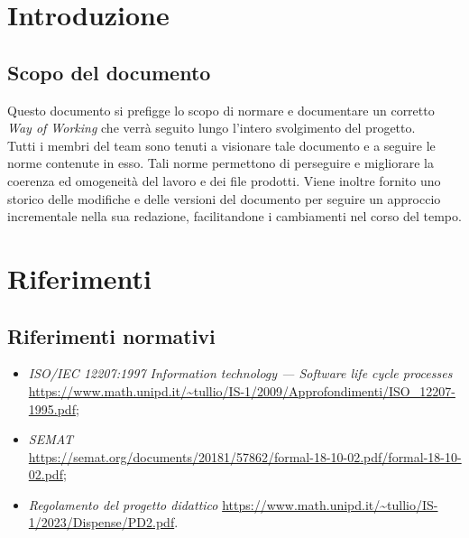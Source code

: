 \documentclass[10pt, a4paper]{article}
\title{\titolo}
\author{SWEetCode}
\begin{document}



\newpage

\tableofcontents
\newpage

\section{Introduzione}
\subsection{Scopo del documento}
Questo documento si prefigge lo scopo di normare e documentare un corretto \textit{Way of Working} che verrà seguito lungo l'intero svolgimento del progetto.\\
Tutti i membri del team sono tenuti a visionare tale documento e a seguire le norme contenute in esso. Tali norme permettono di perseguire e migliorare la coerenza ed omogeneità del lavoro e dei file prodotti.
Viene inoltre fornito uno storico delle modifiche e delle versioni del documento per seguire un approccio incrementale nella sua redazione, facilitandone i cambiamenti nel corso del tempo.

\section{Riferimenti}
    \subsection{Riferimenti normativi}
    \begin{itemize}
        \item \textit{ISO/IEC 12207:1997 Information technology — Software life cycle processes}\\
        \url{https://www.math.unipd.it/~tullio/IS-1/2009/Approfondimenti/ISO_12207-1995.pdf};
        \item \textit{SEMAT}\\
        \url{https://semat.org/documents/20181/57862/formal-18-10-02.pdf/formal-18-10-02.pdf};
        \item \textit{Regolamento del progetto didattico}
        \url{https://www.math.unipd.it/~tullio/IS-1/2023/Dispense/PD2.pdf}.
    \end{itemize}
\end{document}
